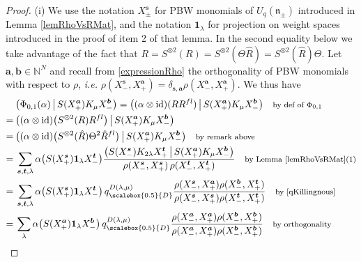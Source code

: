 \documentclass[11pt]{amsart}
\newcommand{\qD}{q_{\scalebox{0.5}{D}}}
\begin{document}
\begin{proof}
(i) We use the notation $X_\pm^{\boldsymbol{s}}$ for PBW monomials of $U_q(\mathfrak{n}_\pm)$ introduced in Lemma \ref{lemRhoVsRMat}, and the notation $\boldsymbol{1}_\lambda$ for projection on weight spaces introduced in the proof of item 2 of that lemma. In the second equality below we take advantage of the fact that $R = S^{\otimes 2}(R) = S^{\otimes 2}(\Theta\hat{R}) = S^{\otimes 2}(\hat{R})\Theta$. Let $\boldsymbol{a}, \boldsymbol{b} \in \mathbb{N}^N$ and recall from \eqref{expressionRho} the orthogonality of PBW monomials with respect to $\rho$, \textit{i.e.} $\rho(X_-^{\boldsymbol{s}}, X_+^{\boldsymbol{a}}) = \delta_{\boldsymbol{s},\boldsymbol{a}} \rho(X_-^{\boldsymbol{a}}, X_+^{\boldsymbol{a}})$. We thus have
\begin{align*}
&\bigl( \Phi_{0,1}(\alpha) \,\big|\, S(X_+^{\boldsymbol{a}})K_\mu X_-^{\boldsymbol{b}} \bigr) = \bigl( (\alpha \otimes \mathrm{id})(RR^{fl}) \,\big|\, S(X_+^{\boldsymbol{a}})K_\mu X_-^{\boldsymbol{b}} \bigr) \quad \text{\footnotesize by def of $\Phi_{0,1}$}\\
=\:& \bigl( (\alpha \otimes \mathrm{id})\bigl( S^{\otimes 2}(R)R^{fl}\bigr) \,\big|\, S(X_+^{\boldsymbol{a}})K_\mu X_-^{\boldsymbol{b}} \bigr) \\
=\:& \bigl( (\alpha \otimes \mathrm{id})\bigl( S^{\otimes 2}(\hat{R})\Theta^2 \hat{R}^{fl} \bigr) \,\big|\, S(X_+^{\boldsymbol{a}})K_\mu X_-^{\boldsymbol{b}} \bigr) \quad \text{\footnotesize by remark above}\\
=\:&\sum_{\boldsymbol{s},\boldsymbol{t},\lambda}\alpha\bigl( S(X_+^{\boldsymbol{s}}) \boldsymbol{1}_\lambda X_-^{\boldsymbol{t}} \bigr) \frac{ \bigl( S(X_-^{\boldsymbol{s}}) K_{2\lambda} X_+^{\boldsymbol{t}} \,\big|\, S(X_+^{\boldsymbol{a}})K_\mu X_-^{\boldsymbol{b}} \bigr)}{\rho(X_-^{\boldsymbol{s}}, X_+^{\boldsymbol{s}})\, \rho(X_-^{\boldsymbol{t}}, X_+^{\boldsymbol{t}})} \quad \text{\footnotesize by Lemma \ref{lemRhoVsRMat}(1)}\\
=\:&\sum_{\boldsymbol{s},\boldsymbol{t},\lambda}\alpha\bigl( S(X_+^{\boldsymbol{s}}) \boldsymbol{1}_\lambda X_-^{\boldsymbol{t}} \bigr) \, \qD^{D(\lambda,\mu)} \frac{\rho(X_-^{\boldsymbol{s}}, X_+^{\boldsymbol{a}})\rho(X_-^{\boldsymbol{b}},X_+^{\boldsymbol{t}})}{\rho(X_-^{\boldsymbol{s}}, X_+^{\boldsymbol{s}})\rho(X_-^{\boldsymbol{t}}, X_+^{\boldsymbol{t}})} \quad \text{\footnotesize by \eqref{qKillingnous}}\\
=\:&\sum_{\lambda}\alpha\bigl( S(X_+^{\boldsymbol{a}}) \boldsymbol{1}_\lambda X_-^{\boldsymbol{b}} \bigr) \, \qD^{D(\lambda,\mu)} \frac{\rho(X_-^{\boldsymbol{a}}, X_+^{\boldsymbol{a}})\rho(X_-^{\boldsymbol{b}},X_+^{\boldsymbol{b}})}{\rho(X_-^{\boldsymbol{a}}, X_+^{\boldsymbol{a}})\rho(X_-^{\boldsymbol{b}}, X_+^{\boldsymbol{b}})} \quad \text{\footnotesize by orthogonality}\\

\end{align*}
\end{proof}
\end{document}
